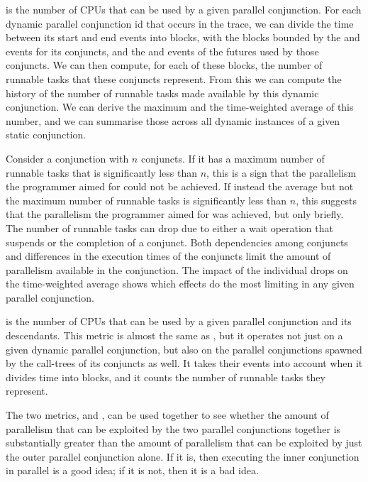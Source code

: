 is the number of CPUs that can be used by a given parallel conjunction.
For each dynamic parallel conjunction id that occurs in the trace,
we can divide the time between its start and end events into blocks,
with the blocks bounded by
the  and  events for its
conjuncts,
and the  and  events
of the futures used by those conjuncts.
We can then compute, for each of these blocks,
the number of runnable tasks that these conjuncts represent.
From this we can compute the history of the number
of runnable tasks made available by this dynamic conjunction.
We can derive the maximum and the time-weighted average of this number,
and we can summarise those
across all dynamic instances of a given static conjunction.

Consider a conjunction with $n$ conjuncts.
If it has a maximum number of runnable tasks
that is significantly less than $n$,
this is a sign that the parallelism the programmer aimed for
could not be achieved.
If instead the average but not the maximum number of runnable tasks
is significantly less than $n$,
this suggests that the parallelism the programmer aimed for was achieved,
but only briefly.
The number of runnable tasks can drop due to
either a wait operation that suspends or the completion of a conjunct.
Both dependencies among conjuncts
and differences in the execution times of the conjuncts
limit the amount of parallelism available in the conjunction.
The impact of the individual drops on the time-weighted average
shows which effects do the most limiting in any given parallel conjunction.

is the number of CPUs that can be used by a given parallel conjunction
and its descendants.
This metric is almost the same as ,
but it operates
not just on a given dynamic parallel conjunction,
but also on the parallel conjunctions
spawned by the call-trees of its conjuncts as well.
It takes their events into account when it divides time into blocks,
and it counts the number of runnable tasks they represent.

The two metrics,
 and
,
can be used together to see whether
the amount of parallelism that can be exploited
by the two parallel conjunctions together is substantially greater than
the amount of parallelism that can be exploited
by just the outer parallel conjunction alone.
If it is, then executing the inner conjunction in parallel is a good idea;
if it is not, then it is a bad idea.

